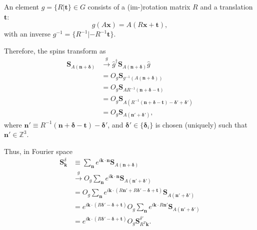 \documentclass[12pt, a4paper]{article}
\begin{document}
An element $g=\{R|\bm{t}\}\in G$ consists of a (im-)\@proper rotation matrix $R$ and a translation $\bm{t}$:
\begin{equation}
  g(A\bm{x})=A(R\bm{x}+\bm{t}),
\end{equation}
with an inverse $g^{-1}=\{R^{-1}|-R^{-1}\bm{t}\}$.

Therefore, the spins transform as
\begin{align*}
  \bm{S}_{A(\bm{n}+\bm{\delta})}&\xrightarrow{g}\hat{g}^{\dagger}\bm{S}_{A(\bm{n}+\bm{\delta})}\hat{g}\\
   &= O_{g}\bm{S}_{g^{-1}(A(\bm{n}+\bm{\delta}))}\\
   &= O_{g}\bm{S}_{AR^{-1}(\bm{n}+\bm{\delta}-\bm{t})}\\
   &= O_{g}\bm{S}_{A(R^{-1}(\bm{n}+\bm{\delta}-\bm{t})-\bm{\delta}'+\bm{\delta}')}\\
   &= O_{g}\bm{S}_{A(\bm{n}'+\bm{\delta}')},
\end{align*}
where $\bm{n}'\equiv R^{-1}(\bm{n}+\bm{\delta}-\bm{t})-\bm{\delta}'$, and $\bm{\delta}'\in\{\bm{\delta}_i\}$ is chosen (uniquely) such that $\bm{n}'\in\mathbb{Z}^{3}$.

Thus, in Fourier space
\begin{align*}
  \bm{S}_{\bm{k}}^{\delta}&\equiv\sum_{\bm{n}}e^{i\bm{k}\cdot\bm{n}}\bm{S}_{A(\bm{n}+\bm{\delta})}\\
   &\xrightarrow{g}O_g\sum_{\bm{n}}e^{i\bm{k}\cdot\bm{n}}\bm{S}_{A(\bm{n}'+\bm{\delta}')}\\
   &=O_g\sum_{\bm{n}}e^{i\bm{k}\cdot(R\bm{n}'+R\bm{\delta}'-\bm{\delta}+\bm{t})}\bm{S}_{A(\bm{n}'+\bm{\delta}')}\\
   &=e^{i\bm{k}\cdot(R\bm{\delta}'-\bm{\delta}+\bm{t})}O_g\sum_{\bm{n}}e^{i\bm{k}\cdot R\bm{n}'}\bm{S}_{A(\bm{n}'+\bm{\delta}')}\\
   &=e^{i\bm{k}\cdot(R\bm{\delta}'-\bm{\delta}+\bm{t})}O_g\bm{S}_{R^T\bm{k}}^{\delta'}.
\end{align*}
\end{document}
